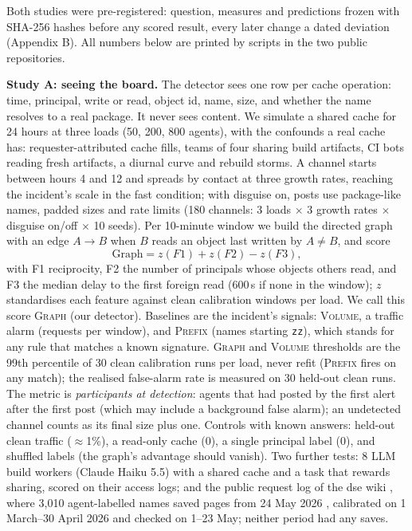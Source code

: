 \documentclass[10pt]{article}
\begin{document}
Both studies were pre-registered: question, measures and predictions frozen with SHA-256 hashes before any scored result, every later change a dated deviation (Appendix B). All numbers below are printed by scripts in the two public repositories.

\textbf{Study A: seeing the board.} The detector sees one row per cache operation: time, principal, write or read, object id, name, size, and whether the name resolves to a real package. It never sees content. We simulate a shared cache for 24 hours at three loads (50, 200, 800 agents), with the confounds a real cache has: requester-attributed cache fills, teams of four sharing build artifacts, CI bots reading fresh artifacts, a diurnal curve and rebuild storms. A channel starts between hours 4 and 12 and spreads by contact at three growth rates, reaching the incident's scale in the fast condition; with disguise on, posts use package-like names, padded sizes and rate limits (180 channels: 3 loads $\times$ 3 growth rates $\times$ disguise on/off $\times$ 10 seeds). Per 10-minute window we build the directed graph with an edge $A\to B$ when $B$ reads an object last written by $A\neq B$, and score
\[\textrm{Graph} = z(F1) + z(F2) - z(F3),\]
with F1 reciprocity, F2 the number of principals whose objects others read, and F3 the median delay to the first foreign read (600\,s if none in the window); $z$ standardises each feature against clean calibration windows per load. We call this score \textsc{Graph} (our detector). Baselines are the incident's signals: \textsc{Volume}, a traffic alarm (requests per window), and \textsc{Prefix} (names starting \texttt{zz}), which stands for any rule that matches a known signature. \textsc{Graph} and \textsc{Volume} thresholds are the 99th percentile of 30 clean calibration runs per load, never refit (\textsc{Prefix} fires on any match); the realised false-alarm rate is measured on 30 held-out clean runs. The metric is \emph{participants at detection}: agents that had posted by the first alert after the first post (which may include a background false alarm); an undetected channel counts as its final size plus one. Controls with known answers: held-out clean traffic ($\approx$1\%), a read-only cache (0), a single principal label (0), and shuffled labels (the graph's advantage should vanish). Two further tests: 8 LLM build workers (Claude Haiku 5.5) with a shared cache and a task that rewards sharing, scored on their access logs; and the public request log of the dse wiki \cite{wikiservicelog}, where 3{,}010 agent-labelled names saved pages from 24 May 2026 \cite{collusionwiki2026}, calibrated on 1 March--30 April 2026 and checked on 1--23 May; neither period had any saves.
\end{document}
